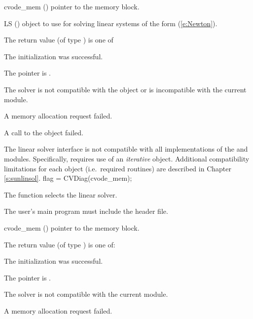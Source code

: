 {
  \begin{args}
  \item[cvode\_mem] ()
    pointer to the {\cvode} memory block.
  \item[LS] ()
    {\sunlinsol} object to use for solving linear systems of the form
    (\ref{e:Newton}).
  \end{args}
}
{
  The return value  (of type ) is one of
  \begin{args}
  \item[\Id{CVSPILS\_SUCCESS}]
    The {\cvspils} initialization was successful.
  \item[\Id{CVSPILS\_MEM\_NULL}]
    The  pointer is .
  \item[\Id{CVSPILS\_ILL\_INPUT}]
    The {\cvspils} solver is not compatible with the  object
    or is incompatible with the current {\nvector} module.
  \item[\Id{CVSPILS\_MEM\_FAIL}]
    A memory allocation request failed.
  \item[\Id{CVSPILS\_SUNLS\_FAIL}]
    A call to the  object failed.
  \end{args}
}
{
  The {\cvspils} linear solver interface is not compatible with all
  implementations of the {\sunlinsol} and {\nvector}
  modules.  Specifically, {\cvspils} requires use of an
  \emph{iterative} {\sunlinsol} object.  Additional compatibility
  limitations for each {\sunlinsol} object (i.e.~required {\nvector}
  routines) are described in Chapter \ref{s:sunlinsol}.
}
{
  flag = CVDiag(cvode\_mem);
}
{
  The function  selects the {\cvdiag} linear solver.

  The user's main program must include the  header file.
}
{
  \begin{args}
  \item[cvode\_mem] ()
    pointer to the {\cvode} memory block.
  \end{args}
}
{
  The return value  (of type ) is one of:
  \begin{args}
  \item[\Id{CVDIAG\_SUCCESS}]
    The {\cvdiag} initialization was successful.
  \item[\Id{CVDIAG\_MEM\_NULL}]
    The  pointer is .
  \item[\Id{CVDIAG\_ILL\_INPUT}]
    The {\cvdiag} solver is not compatible with the current {\nvector} module.
  \item[\Id{CVDIAG\_MEM\_FAIL}]
    A memory allocation request failed.
  \end{args}
}

